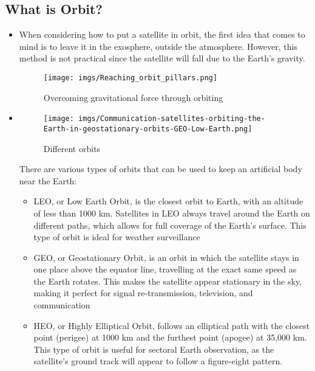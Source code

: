 \documentclass{article}
\begin{document}
    \subsection{What is Orbit?}
        \begin{itemize}
            \item[] When considering how to put a satellite in orbit, the first idea that comes to mind is to leave it in the exosphere, outside the atmosphere. However, this method is not practical since the satellite will fall due to the Earth's gravity.
            \begin{figure}[H]
                \centering
                \texttt{[image: imgs/Reaching\_orbit\_pillars.png]}  
                \caption{Overcoming gravitational force through orbiting \cite{3}}
                \label{orbit1-img}
            \end{figure}
            \item[] \parbox[t]{\dimexpr\textwidth-\leftmargin}{
                \begin{wrapfigure}{R}{0.45\textwidth}
                    \vspace{-\baselineskip}
                    \texttt{[image: imgs/Communication-satellites-orbiting-the-Earth-in-geostationary-orbits-GEO-Low-Earth.png]}
                    \caption{Different orbits \cite{5}}
                \end{wrapfigure}
                There are various types of orbits that can be used to keep an artificial body near the Earth:
                \begin{itemize}
                    \item LEO, or Low Earth Orbit, is the closest orbit to Earth, with an altitude of less than 1000 km. Satellites in LEO always travel around the Earth on different paths, which allows for full coverage of the Earth's surface. This type of orbit is ideal for weather surveillance
                    \item GEO, or Geostationary Orbit, is an orbit in which the satellite stays in one place above the equator line, travelling at the exact same speed as the Earth rotates. This makes the satellite appear stationary in the sky, making it perfect for signal re-transmission, television, and communication
                    \item HEO, or Highly Elliptical Orbit, follows an elliptical path with the closest point (perigee) at 1000 km and the furthest point (apogee) at 35,000 km. This type of orbit is useful for sectoral Earth observation, as the satellite's ground track will appear to follow a figure-eight pattern.


                \end{itemize}
                }
        
           
        \end{itemize}
\end{document}
